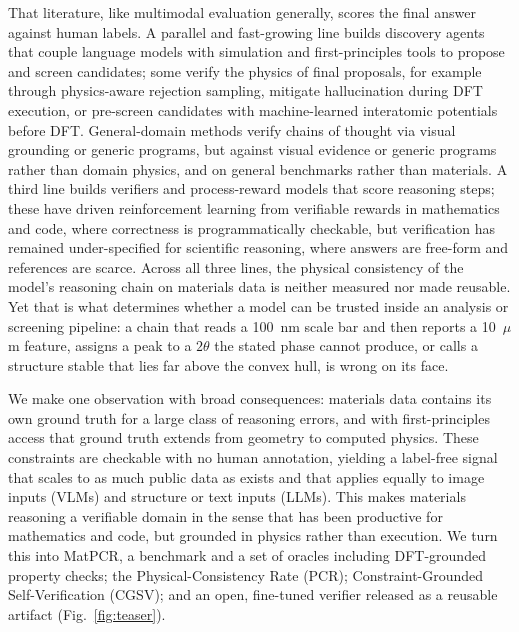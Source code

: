 \documentclass[pdflatex,sn-nature]{sn-jnl}
\begin{document}
That literature, like multimodal evaluation generally, scores the final answer
against human labels. A parallel and fast-growing line builds discovery agents that
couple language models with simulation and first-principles tools to propose and
screen candidates;\cite{dreams2025,crystalyse2025,mapps2025,atomagents2024,llmatdesign2024,matpc2025,kang2024chatmof,zhang2024honeycomb,survey2025aimat}
some verify the physics of final proposals, for example through physics-aware
rejection sampling,\cite{physrej2025} mitigate hallucination during DFT
execution,\cite{dreams2025} or pre-screen candidates with machine-learned
interatomic potentials before DFT.\cite{genbaselines2025,chgnet2023} General-domain
methods verify chains of thought via visual grounding or generic
programs,\cite{corgi2025,mmverify2025,vlmr3_2026,prove2024} but against visual
evidence or generic programs rather than domain physics, and on general benchmarks
rather than materials. A third line builds verifiers and process-reward models that
score reasoning steps;\cite{processbench2025,compassverifier2025,t1verify2025} these
have driven reinforcement learning from verifiable rewards in mathematics and code,
where correctness is programmatically checkable,\cite{deepseekr1_2025} but
verification has remained under-specified for scientific reasoning, where answers are
free-form and references are scarce.\cite{scirlvr2026} Across all three lines, the
physical consistency of the model's reasoning chain on materials data is neither
measured nor made reusable. Yet that is what
determines whether a model can be trusted inside an analysis or screening pipeline:
a chain that reads a 100~nm scale bar and then reports a 10~$\mu$m feature, assigns
a peak to a $2\theta$ the stated phase cannot produce, or calls a structure stable
that lies far above the convex hull, is wrong on its face.

We make one observation with broad consequences: materials data contains its own
ground truth for a large class of reasoning errors, and with first-principles access
that ground truth extends from geometry to computed physics. These constraints are
checkable with no human annotation, yielding a label-free signal that scales to as
much public data as exists and that applies equally to image inputs (VLMs) and
structure or text inputs (LLMs). This makes materials reasoning a verifiable domain
in the sense that has been productive for mathematics and code, but grounded in
physics rather than execution. We turn this into MatPCR, a benchmark and a set of
oracles including DFT-grounded property checks; the Physical-Consistency Rate (PCR);
Constraint-Grounded Self-Verification (CGSV); and an open, fine-tuned verifier
released as a reusable artifact (Fig.~\ref{fig:teaser}).
\end{document}
